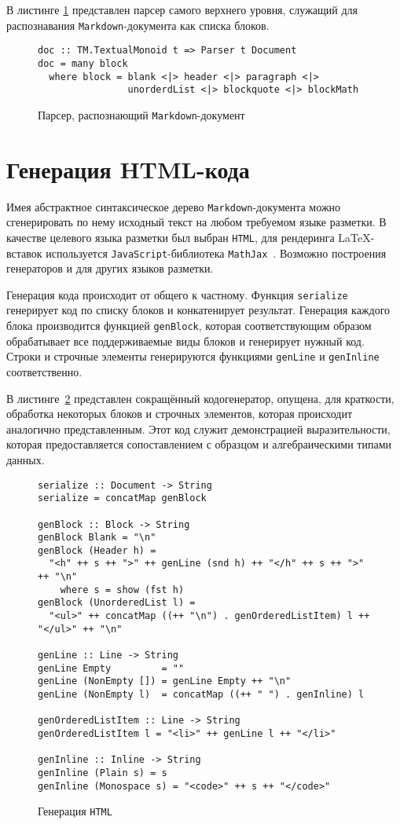 В листинге \ref{listing:MarkdownDoc} представлен парсер самого верхнего уровня,
служащий для распознавания \lstinline{Markdown}-документа как списка блоков.

\begin{figure}[h]
\begin{lstlisting}
doc :: TM.TextualMonoid t => Parser t Document
doc = many block
  where block = blank <|> header <|> paragraph <|>
                unorderdList <|> blockquote <|> blockMath
\end{lstlisting}
\caption{Парсер, распознающий \lstinline{Markdown}-документ}
\label{listing:MarkdownDoc}
\end{figure}

\section{Генерация HTML-кода}

Имея абстрактное синтаксическое дерево \lstinline{Markdown}-документа можно
сгенерировать по нему исходный текст на любом требуемом языке разметки.
В качестве целевого языка разметки был выбран \lstinline{HTML}, для рендеринга
\LaTeX-вставок используется \lstinline{JavaScript}-библиотека
\lstinline{MathJax}~\cite{mathJax}. Возможно построения генераторов и для
других языков разметки.

Генерация кода происходит от общего к частному. Функция \lstinline{serialize}
генерирует код по списку блоков и конкатенирует результат. Генерация каждого 
блока производится функцией \lstinline{genBlock}, которая соответствующим
образом обрабатывает все поддерживаемые виды блоков и генерирует нужный код. 
Строки и строчные элементы генерируются функциями \lstinline{genLine} и 
\lstinline{genInline} соответственно.

В листинге~\ref{listing:HTMLGen} представлен сокращённый кодогенератор, опущена,
для краткости, обработка некоторых блоков и строчных элементов, которая
происходит аналогично представленным. Этот код служит демонстрацией
выразительности, которая предоставляется сопоставлением с образцом и
алгебраическими типами данных.

\begin{figure}[h]
\begin{lstlisting}
serialize :: Document -> String
serialize = concatMap genBlock

genBlock :: Block -> String
genBlock Blank = "\n"
genBlock (Header h) =
  "<h" ++ s ++ ">" ++ genLine (snd h) ++ "</h" ++ s ++ ">" ++ "\n"
    where s = show (fst h)
genBlock (UnorderedList l) =
  "<ul>" ++ concatMap ((++ "\n") . genOrderedListItem) l ++ "</ul>" ++ "\n"

genLine :: Line -> String
genLine Empty         = ""
genLine (NonEmpty []) = genLine Empty ++ "\n"
genLine (NonEmpty l)  = concatMap ((++ " ") . genInline) l

genOrderedListItem :: Line -> String
genOrderedListItem l = "<li>" ++ genLine l ++ "</li>"

genInline :: Inline -> String
genInline (Plain s) = s
genInline (Monospace s) = "<code>" ++ s ++ "</code>"
\end{lstlisting}
\caption{Генерация \lstinline{HTML}}
\label{listing:HTMLGen}
\end{figure}

